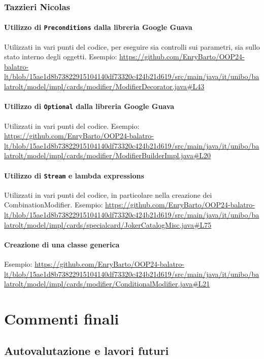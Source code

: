 \documentclass[a4paper,12pt]{report}
\begin{document}
\subsection{Tazzieri Nicolas}
\subsubsection{Utilizzo di \texttt{Preconditions} dalla libreria Google Guava}
Utilizzati in vari punti del codice, per eseguire sia controlli sui parametri, sia sullo stato interno degli oggetti. Esempio: \url{https://github.com/EnryBarto/OOP24-balatro-lt/blob/15ae1d8b73822915104140df73320c424b21d619/src/main/java/it/unibo/balatrolt/model/impl/cards/modifier/ModifierDecorator.java#L43}
\subsubsection{Utilizzo di \texttt{Optional} dalla libreria Google Guava}
Utilizzati in vari punti del codice. Esempio: \url{https://github.com/EnryBarto/OOP24-balatro-lt/blob/15ae1d8b73822915104140df73320c424b21d619/src/main/java/it/unibo/balatrolt/model/impl/cards/modifier/ModifierBuilderImpl.java#L20}
\subsubsection{Utilizzo di \texttt{Stream} e lambda expressions}
Utilizzati in vari punti del codice, in particolare nella creazione dei CombinationModifier. Esempio: \url{https://github.com/EnryBarto/OOP24-balatro-lt/blob/15ae1d8b73822915104140df73320c424b21d619/src/main/java/it/unibo/balatrolt/model/impl/cards/specialcard/JokerCatalogMisc.java#L75}
\subsubsection{Creazione di una classe generica}
Esempio: \url{https://github.com/EnryBarto/OOP24-balatro-lt/blob/15ae1d8b73822915104140df73320c424b21d619/src/main/java/it/unibo/balatrolt/model/impl/cards/modifier/ConditionalModifier.java#L21}


\chapter{Commenti finali}

\section{Autovalutazione e lavori futuri}
\end{document}
